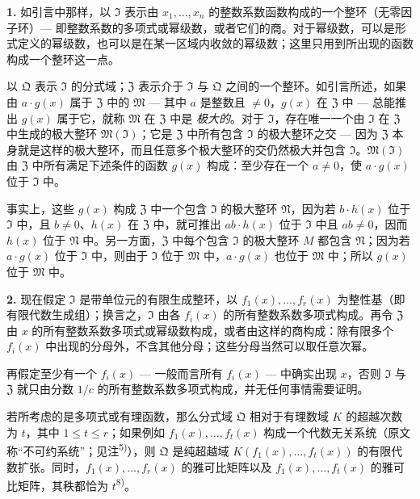 \documentclass[11pt]{article}
\begin{document}
\noindent\textbf{1.}
如引言中那样，以 $\mathfrak{I}$ 表示由 $x_1,\ldots,x_n$ 的整数系数函数构成的一个整环（无零因子环）--- 即整数系数的多项式或幂级数，或者它们的商。对于幂级数，可以是形式定义的幂级数，也可以是在某一区域内收敛的幂级数；这里只用到所出现的函数构成一个整环这一点。

以 $\mathfrak{Q}$ 表示 $\mathfrak{I}$ 的分式域；$\mathfrak{Z}$ 表示介于 $\mathfrak{I}$ 与 $\mathfrak{Q}$ 之间的一个整环。如引言所述，如果由 $a \cdot g(x)$ 属于 $\mathfrak{Z}$ 中的 $\mathfrak{M}$ --- 其中 $a$ 是整数且 $\neq 0$，$g(x)$ 在 $\mathfrak{Z}$ 中 --- 总能推出 $g(x)$ 属于它，就称 $\mathfrak{M}$ 在 $\mathfrak{Z}$ 中是 \textit{极大的}。对于 $\mathfrak{I}$，存在唯一一个由 $\mathfrak{I}$ 在 $\mathfrak{Z}$ 中生成的极大整环 $\mathfrak{M}(\mathfrak{I})$；它是 $\mathfrak{Z}$ 中所有包含 $\mathfrak{I}$ 的极大整环之交 --- 因为 $\mathfrak{Z}$ 本身就是这样的极大整环，而且任意多个极大整环的交仍然极大并包含 $\mathfrak{I}$。$\mathfrak{M}(\mathfrak{I})$ 由 $\mathfrak{Z}$ 中所有满足下述条件的函数 $g(x)$ 构成：至少存在一个 $a \neq 0$，使 $a \cdot g(x)$ 位于 $\mathfrak{I}$ 中。

事实上，这些 $g(x)$ 构成 $\mathfrak{Z}$ 中一个包含 $\mathfrak{I}$ 的极大整环 $\mathfrak{N}$，因为若 $b \cdot h(x)$ 位于 $\mathfrak{I}$ 中，且 $b \neq 0$、$h(x)$ 在 $\mathfrak{Z}$ 中，就可推出 $ab \cdot h(x)$ 位于 $\mathfrak{I}$ 中且 $ab \neq 0$，因而 $h(x)$ 位于 $\mathfrak{N}$ 中。另一方面，$\mathfrak{Z}$ 中每个包含 $\mathfrak{I}$ 的极大整环 $M$ 都包含 $\mathfrak{N}$；因为若 $a \cdot g(x)$ 位于 $\mathfrak{I}$ 中，则由于 $\mathfrak{I}$ 位于 $\mathfrak{M}$ 中，$a \cdot g(x)$ 也位于 $\mathfrak{M}$ 中；所以 $g(x)$ 位于 $\mathfrak{M}$ 中。

\medskip\noindent\textbf{2.}
现在假定 $\mathfrak{I}$ 是带单位元的有限生成整环，以 $f_1(x),\ldots,f_r(x)$ 为整性基（即有限代数生成组）；换言之，$\mathfrak{I}$ 由各 $f_i(x)$ 的所有整数系数多项式构成。再令 $\mathfrak{Z}$ 由 $x$ 的所有整数系数多项式或幂级数构成，或者由这样的商构成：除有限多个 $f_i(x)$ 中出现的分母外，不含其他分母；这些分母当然可以取任意次幂。

再假定至少有一个 $f_i(x)$ --- 一般而言所有 $f_i(x)$ --- 中确实出现 $x$，否则 $\mathfrak{I}$ 与 $\mathfrak{Z}$ 就只由分数 $1/c$ 的所有整数系数多项式构成，并无任何事情需要证明。

若所考虑的是多项式或有理函数，那么分式域 $\mathfrak{Q}$ 相对于有理数域 $K$ 的超越次数为 $t$，其中 $1 \leq t \leq r$；如果例如 $f_1(x),\ldots,f_t(x)$ 构成一个代数无关系统（原文称“不可约系统”；见注\textsuperscript{5)}），则 $\mathfrak{Q}$ 是纯超越域 $K(f_1(x),\ldots,f_t(x))$ 的有限代数扩张。同时，$f_1(x),\ldots,f_r(x)$ 的雅可比矩阵以及 $f_1(x),\ldots,f_t(x)$ 的雅可比矩阵，其秩都恰为 $t$\textsuperscript{8)}。
\end{document}
